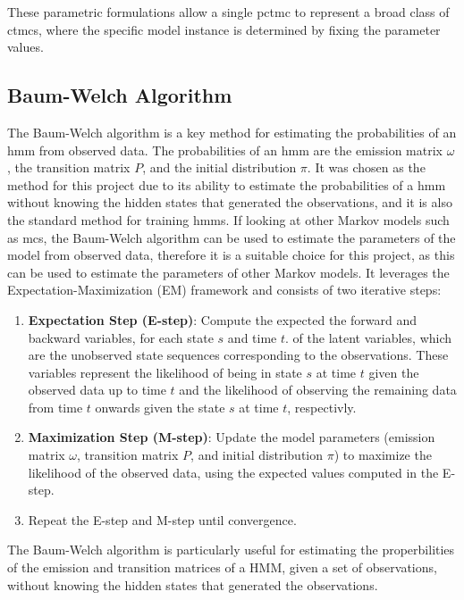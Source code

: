 These parametric formulations allow a single \gls{pctmc} to represent a broad class of \glspl{ctmc}, where the specific model instance is determined by fixing the parameter values.

\subsection{Baum-Welch Algorithm}\label{subsec:baum-welch}
The Baum-Welch algorithm is a key method for estimating the probabilities of an \gls{hmm} from observed data. 
The probabilities of an \gls{hmm} are the emission matrix $\omega$, the transition matrix $P$, and the initial distribution $\pi$.
It was chosen as the method for this project due to its ability to estimate the probabilities of a \gls{hmm} without knowing the hidden states that generated the observations, and it is also the standard method for training \glspl{hmm}.
If looking at other Markov models such as \glspl{mc}, the Baum-Welch algorithm can be used to estimate the parameters of the model from observed data, therefore it is a suitable choice for this project, as this can be used to estimate the parameters of other Markov models.
It leverages the Expectation-Maximization (EM) framework and consists of two iterative steps:

\begin{enumerate}
    \item \textbf{Expectation Step (E-step)}: Compute the expected the forward and backward variables, for each state $s$ and time $t$. of the latent variables, which are the unobserved state sequences corresponding to the observations. These variables represent the likelihood of being in state $s$ at time $t$ given the observed data up to time $t$ and the likelihood of observing the remaining data from time $t$ onwards given the state $s$ at time $t$, respectivly. 
    \item \textbf{Maximization Step (M-step)}: Update the model parameters (emission matrix $\omega$, transition matrix $P$, and initial distribution $\pi$) to maximize the likelihood of the observed data, using the expected values computed in the E-step.
    \item Repeat the E-step and M-step until convergence.
\end{enumerate}

The Baum-Welch algorithm is particularly useful for estimating the properbilities of the emission and transition matrices of a HMM, given a set of observations, without knowing the hidden states that generated the observations.

